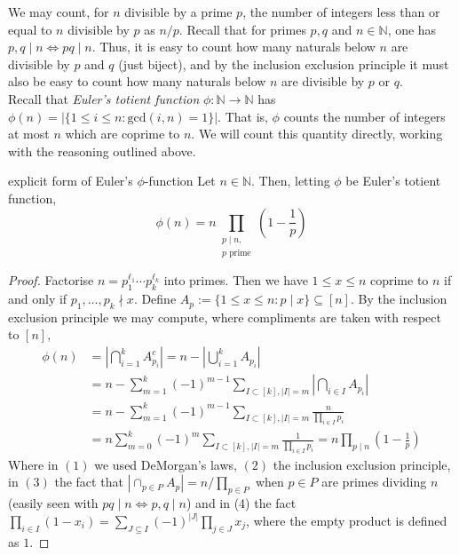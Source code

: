 \documentclass{article}
\begin{document}
We may count, for $n$ divisible by a prime $p$, the number of integers less than or equal to $n$ divisible by $p$ as $n/p$. 
Recall  that for primes $p, q$ and $n \in \mathbb{N}$, one has $p, q \mid n \Leftrightarrow pq \mid n$. Thus, it is easy to count how 
many naturals below $n$ are divisible by $p$ and $q$ (just biject), and by the inclusion exclusion principle it must also be easy to 
count how many naturals below $n$ are divisible by $p$ or $q$. \\

Recall that {\it Euler's totient function} $\phi: \mathbb{N} \to \mathbb{N}$ has $\phi(n) = |\{1 \leq i \leq n : \text{gcd}(i, n) = 1\}|$. 
That is, $\phi$ counts the number of integers at most $n$ which are coprime to $n$. We will count this quantity directly, working with 
the reasoning outlined above.

\begin{proposition}[]{explicit form of Euler's $\phi$-function}
    Let $n \in \mathbb{N}$. Then, letting $\phi$ be Euler's totient function, 
    \[\phi(n) = n \! \! \! \prod_{\substack{p \mid n, \\ p \text{ prime}}} \! \! \! \left(1 - \frac{1}{p}\right)\]
\end{proposition}

\begin{proof}
    Factorise $n = p_1^{\ell_1} \cdots p_k^{\ell_k}$ into primes. Then we have $1 \leq x \leq n$ coprime to $n$ 
    if and only if $p_1, \dots, p_k \nmid x$. Define $A_p := \{1 \leq x \leq n : p \mid x\} \subseteq [n]$. 
    By the inclusion exclusion principle we may compute, where compliments are taken with respect to $[n]$, 
    \begin{align*}
        \phi(n) &= \left|\bigcap_{i=1}^kA_{p_i}^c\right| = n - \left|\bigcup_{i=1}^k A_{p_i}\right| \tag{1}\\
        &= n - \sum_{m = 1}^k (-1)^{m-1} \sum_{I \subset [k], |I| = m}\left|\bigcap_{i \in I}A_{p_i}\right| \tag{2}\\
        &= n - \sum_{m = 1}^k (-1)^{m-1} \sum_{I \subset [k], |I| = m}\frac{n}{\prod_{i \in I}p_i} \tag{3}\\
        &= n\sum_{m = 0}^k (-1)^{m} \sum_{I \subset [k], |I| = m}\frac{1}{\prod_{i \in I}p_i} \tag{4}
        = n\prod_{p \mid n}\left(1 - \frac{1}{p}\right)
    \end{align*}
    Where in $(1)$ we used DeMorgan's laws, $(2)$ the inclusion exclusion principle, in $(3)$ the fact that 
    $|\cap_{p \in P}A_p| = n/\prod_{p \in P}$ when $p \in P$ are primes dividing $n$ (easily seen with 
    $pq \mid n \Leftrightarrow p,q \mid n$) and in (4) the fact $\prod_{i \in I}(1-x_i) = \sum_{J \subseteq I}(-1)^{|J|}\prod_{j \in J}x_j$, 
    where the empty product is defined as $1$. 
\end{proof}
\end{document}
